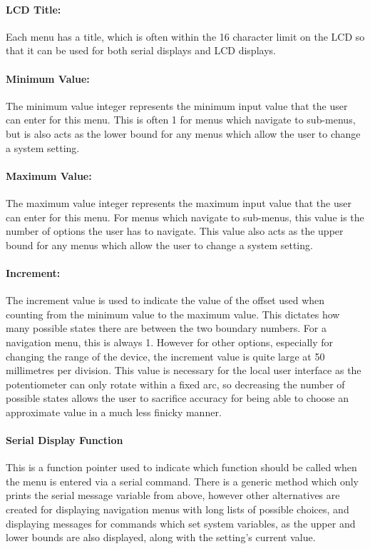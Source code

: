 \documentclass[]{report}
\begin{document}
\paragraph{LCD Title:}
Each menu has a title, which is often within the 16 character limit on the LCD so that it can be used for both serial displays and LCD displays. 

\paragraph{Minimum Value:}
The minimum value integer represents the minimum input value that the user can enter for this menu. This is often 1 for menus which navigate to sub-menus, but is also acts as the lower bound for any menus which allow the user to change a system setting. 

\paragraph{Maximum Value:}
The maximum value integer represents the maximum input value that the user can enter for this menu. For menus which navigate to sub-menus, this value is the number of options the user has to navigate. This value also acts as the upper bound for any menus which allow the user to change a system setting. 

\paragraph{Increment:}
The increment value is used to indicate the value of the offset used when counting from the minimum value to the maximum value. This dictates how many possible states there are between the two boundary numbers. For a navigation menu, this is always 1. However for other options, especially for changing the range of the device, the increment value is quite large at 50 millimetres per division. This value is necessary for the local user interface as the potentiometer can only rotate within a fixed arc, so decreasing the number of possible states allows the user to sacrifice accuracy for being able to choose an approximate value in a much less finicky manner.

\paragraph{Serial Display Function}
This is a function pointer used to indicate which function should be called when the menu is entered via a serial command. There is a generic method which only prints the serial message variable from above, however other alternatives are created for displaying navigation menus with long lists of possible choices, and displaying messages for commands which set system variables, as the upper and lower bounds are also displayed, along with the setting's current value.
\end{document}
